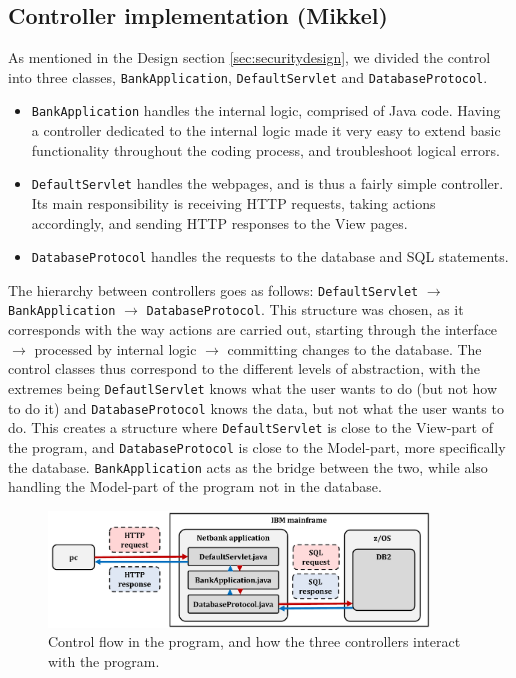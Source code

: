 \subsection{Controller implementation (Mikkel) }
As mentioned in the Design section \ref{sec:securitydesign}, we divided the control into three classes, \texttt{BankApplication}, \texttt{DefaultServlet} and \texttt{DatabaseProtocol}. 

\begin{itemize}
    \item \texttt{BankApplication} handles the internal logic, comprised of Java code. Having a controller dedicated to the internal logic made it very easy to extend basic functionality throughout the coding process, and troubleshoot logical errors.
    \item \texttt{DefaultServlet} handles the webpages, and is thus a fairly simple controller. Its main responsibility is receiving HTTP requests, taking actions accordingly, and sending HTTP responses to the View pages.
    \item \texttt{DatabaseProtocol} handles the requests to the database and SQL statements.
\end{itemize}
  
The hierarchy between controllers goes as follows: \texttt{DefaultServlet} $\rightarrow$ \texttt{BankApplication} $\rightarrow$ \texttt{DatabaseProtocol}. This structure was chosen, as it corresponds with the way actions are carried out, starting through the interface $\rightarrow$ processed by internal logic $\rightarrow$ committing changes to the database. The control classes thus correspond to the different levels of abstraction, with the extremes being \texttt{DefautlServlet} knows what the user wants to do (but not how to do it) and \texttt{DatabaseProtocol} knows the data, but not what the user wants to do. This creates a structure where \texttt{DefaultServlet} is close to the View-part of the program, and \texttt{DatabaseProtocol} is close to the Model-part, more specifically the database. \texttt{BankApplication} acts as the bridge between the two, while also handling the Model-part of the program not in the database.

\begin{figure}[H]
\centering
\includegraphics[width = 0.9\textwidth]{figures/interaction_transfer.pdf}
\caption{Control flow in the program, and how the three controllers interact with the program.}
\label{fig:interactiontransfer}
\end{figure}